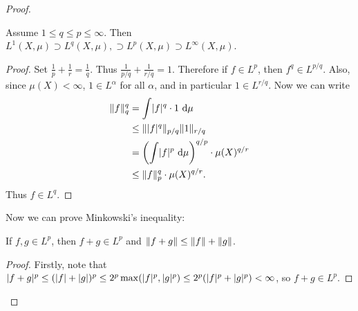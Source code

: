 \documentclass[10pt, twoside]{article}
\renewcommand{\d}{\ \mathrm{d}}
\begin{document}
\begin{thm}
\begin{proof}
            \begin{mdframed}[style=default]
                \begin{cor}
                    Assume $1 \leq q \leq p \leq \infty$. Then $L^1(X,\mu) \supset L^q(X,\mu), \supset L^p(X,\mu) \supset L^{\infty}(X,\mu)$.
                \end{cor}
                \begin{proof}
                    Set $\frac{1}{p} + \frac{1}{r} = \frac{1}{q}$. Thus $\frac{1}{p/q} + \frac{1}{r/q} = 1$. Therefore if $f \in L^p$, then $f^{q} \in L^{p/q}$. Also, since $\mu(X) < \infty$, $1 \in L^{\alpha}$ for all $\alpha$, and in particular $1 \in L^{r/q}$. Now we can write
                    \begin{align*}
                        \norm{f}_q^q &= \int \abs{f}^q \cdot 1 \d \mu \\
                                     &\leq \norm{\abs{f}^q}_{p/q} \norm{1}_{r/q} \\
                                     &= \left( \int \abs{f}^p \d \mu \right)^{q/p} \cdot \mu(X)^{q/r} \\
                                     &\leq \norm{f}_p^{q} \cdot \mu(X)^{q/r}.
                    \end{align*}
                    Thus $f \in L^q$.
                \end{proof}
            \end{mdframed}

            Now we can prove Minkowski's inequality:
            \begin{mdframed}[style=default]
                \begin{thm}
                    If $f,g \in L^p$, then $f + g \in L^p$ and $\lVert f+g\rVert \leq \lVert f\rVert + \lVert g\rVert$.
                \end{thm}
                \begin{proof}
                    Firstly, note that $\lvert f+g\rvert^p \leq (\lvert f\rvert + \lvert g\rvert)^p \leq 2^p\max(\lvert f\rvert^p, \lvert g\rvert^p) \leq 2^p(\lvert f\rvert^p + \lvert g\rvert^p) < \infty$, so $f+g \in L^p$.


\end{proof}
\end{mdframed}
\end{proof}
\end{thm}
\end{document}
